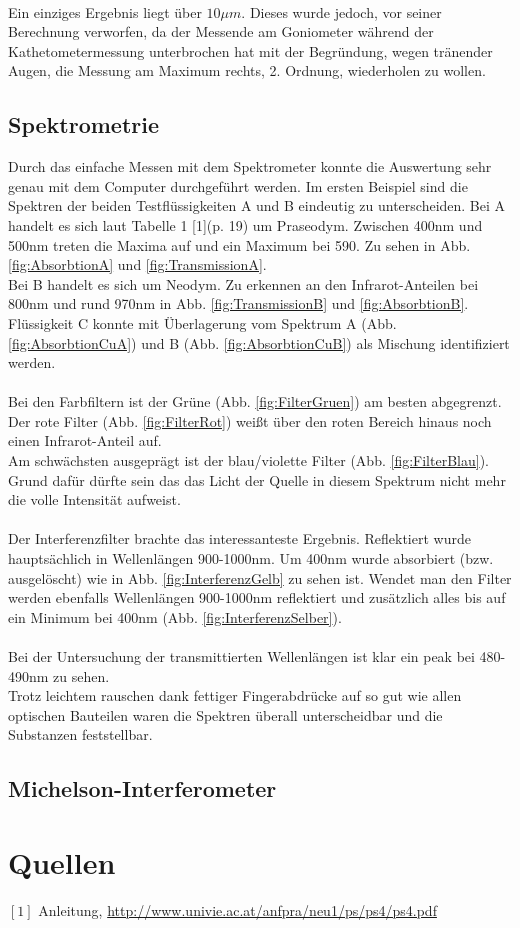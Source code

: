 \documentclass[12pt,a4paper]{article}
\begin{document}
\begin{multicols}{2}
\\
Ein einziges Ergebnis liegt über $10\mu m$. Dieses wurde jedoch, vor seiner Berechnung verworfen, da der Messende am Goniometer während der Kathetometermessung unterbrochen hat mit der Begründung, wegen tränender Augen, die Messung am Maximum rechts, 2. Ordnung, wiederholen zu wollen.\\



\subsection{Spektrometrie}
Durch das einfache Messen mit dem Spektrometer konnte die Auswertung sehr genau mit dem Computer durchgeführt werden. Im ersten Beispiel sind die Spektren der beiden Testflüssigkeiten A und B eindeutig zu unterscheiden. Bei A handelt es sich laut Tabelle 1 [1](p. 19) um Praseodym. Zwischen 400nm und 500nm treten die Maxima auf und ein Maximum bei 590. Zu sehen in Abb. \ref{fig:AbsorbtionA} und \ref{fig:TransmissionA}.\\
Bei B handelt es sich um Neodym. Zu erkennen an den Infrarot-Anteilen bei 800nm und rund 970nm in Abb. \ref{fig:TransmissionB} und \ref{fig:AbsorbtionB}.\\
Flüssigkeit C konnte mit Überlagerung vom Spektrum A (Abb. \ref{fig:AbsorbtionCuA}) und B (Abb. \ref{fig:AbsorbtionCuB}) als Mischung identifiziert werden.\\
\\
Bei den Farbfiltern ist der Grüne (Abb. \ref{fig:FilterGruen}) am besten abgegrenzt. Der rote Filter (Abb. \ref{fig:FilterRot}) weißt über den roten Bereich hinaus noch einen Infrarot-Anteil auf.\\
Am schwächsten ausgeprägt ist der blau/violette Filter (Abb. \ref{fig:FilterBlau}). Grund dafür dürfte sein das das Licht der Quelle in diesem Spektrum nicht mehr die volle Intensität aufweist.\\
\\
Der Interferenzfilter brachte das interessanteste Ergebnis. Reflektiert wurde hauptsächlich in Wellenlängen 900-1000nm. Um 400nm wurde absorbiert (bzw. ausgelöscht) wie in Abb. \ref{fig:InterferenzGelb} zu sehen ist. Wendet man den Filter werden ebenfalls Wellenlängen 900-1000nm reflektiert und zusätzlich alles bis auf ein Minimum bei 400nm (Abb. \ref{fig:InterferenzSelber}).\\
\\
Bei der Untersuchung der transmittierten Wellenlängen ist klar ein peak bei 480-490nm zu sehen.\\
Trotz leichtem rauschen dank fettiger Fingerabdrücke auf so gut wie allen optischen Bauteilen waren die Spektren überall unterscheidbar und die Substanzen feststellbar.

\subsection{Michelson-Interferometer}


\section{Quellen}
$[1]$ Anleitung, \url{http://www.univie.ac.at/anfpra/neu1/ps/ps4/ps4.pdf}\\
\end{multicols}
\end{document}
